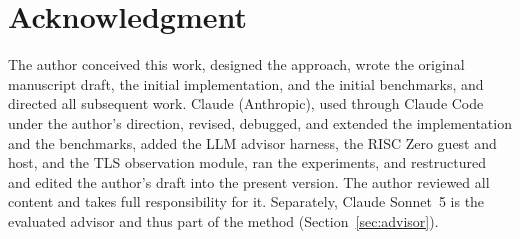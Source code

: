 \section*{Acknowledgment}
The author conceived this work, designed the approach, wrote the original manuscript draft, the initial implementation, and the initial benchmarks, and directed all subsequent work. Claude (Anthropic), used through Claude Code under the author's direction, revised, debugged, and extended the implementation and the benchmarks, added the LLM advisor harness, the RISC Zero guest and host, and the TLS observation module, ran the experiments, and restructured and edited the author's draft into the present version. The author reviewed all content and takes full responsibility for it. Separately, Claude Sonnet~5 is the evaluated advisor and thus part of the method (Section~\ref{sec:advisor}).

